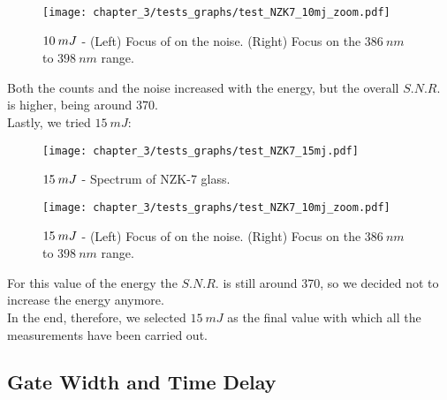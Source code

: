 \begin{figure}[H]
    \centering
    \texttt{[image: chapter\_3/tests\_graphs/test\_NZK7\_10mj\_zoom.pdf]} 
     \vspace*{-30pt}
    \caption{$\protect 10 \: mJ$ - (Left) Focus of on the noise. (Right) Focus on the $386 \: nm$ to $398 \: nm$ range.}
    \label{fig:test_NZK7_10mj_zoom}
 \end{figure}
Both the counts and the noise increased with the energy, but the overall $S.N.R.$ is higher, being around 370.
\\
Lastly, we tried $15 \: mJ$:
\begin{figure}[H]
    \centering
    \texttt{[image: chapter\_3/tests\_graphs/test\_NZK7\_15mj.pdf]} 
     \vspace*{-30pt}
    \caption{$\protect 15 \: mJ$ - Spectrum of NZK-7 glass.}
    \label{fig:test_NZK7_15mj}
\end{figure}
\begin{figure}[H]
    \centering
    \texttt{[image: chapter\_3/tests\_graphs/test\_NZK7\_10mj\_zoom.pdf]} 
     \vspace*{-30pt}
    \caption{$\protect 15 \: mJ$ - (Left) Focus of on the noise. (Right) Focus on the $386 \: nm$ to $398 \: nm$ range.}
    \label{fig:test_NZK7_15mj_zoom}
 \end{figure}

For this value of the energy the $S.N.R.$ is still around 370, so we decided not to increase the energy anymore.
\\
In the end, therefore, we selected $15 \: mJ$ as the final value with which all the measurements have been carried out. 

\subsection{Gate Width and Time Delay}
\label{subsec:gate_width_delay}

